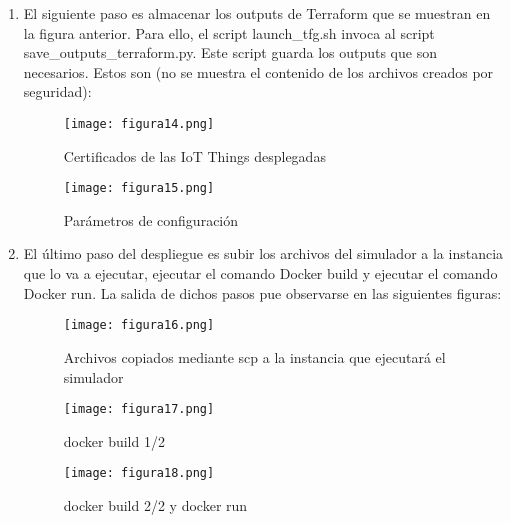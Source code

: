 \documentclass[../../memoria.tex]{subfiles}
\begin{document}
\begin{enumerate}
    \item El siguiente paso es almacenar los outputs de Terraform que se muestran en la figura anterior. Para ello, el script launch\_tfg.sh invoca al script save\_outputs\_terraform.py. Este script guarda los outputs que son necesarios. Estos son (no se muestra el contenido de los archivos creados por seguridad):
          \begin{figure}[H]
              \centering
              \texttt{[image: figura14.png]}
              \caption{Certificados de las IoT Things desplegadas}
              \label{fig:figura14}
          \end{figure}

          \begin{figure}[H]
              \centering
              \texttt{[image: figura15.png]}
              \caption{Parámetros de configuración}
              \label{fig:figura15}
          \end{figure}

    \item El último paso del despliegue es subir los archivos del simulador a la instancia que lo va a ejecutar, ejecutar el comando Docker build y ejecutar el comando Docker run. La salida de dichos pasos pue observarse en las siguientes figuras:
          \begin{figure}[H]
              \centering
              \texttt{[image: figura16.png]}
              \caption{Archivos copiados mediante scp a la instancia que ejecutará el simulador}
              \label{fig:figura16}
          \end{figure}
          \begin{figure}[H]
              \centering
              \texttt{[image: figura17.png]}
              \caption{docker build 1/2}
              \label{fig:figura17}
          \end{figure}
          \begin{figure}[H]
              \centering
              \texttt{[image: figura18.png]}
              \caption{docker build 2/2 y docker run}
              \label{fig:figura18}
          \end{figure}
\end{enumerate}
\end{document}
